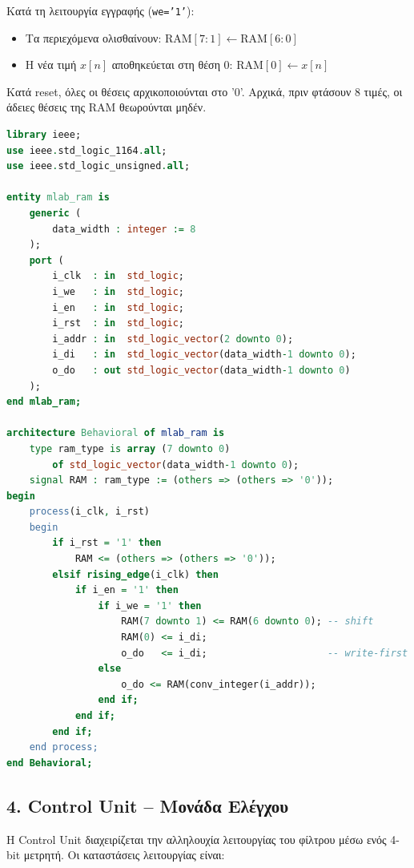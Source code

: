 \documentclass[12pt]{article}
\begin{document}
Κατά τη λειτουργία εγγραφής (\texttt{we='1'}):
\begin{itemize}
    \item Τα περιεχόμενα ολισθαίνουν: $\text{RAM}[7:1] \leftarrow \text{RAM}[6:0]$
    \item Η νέα τιμή $x[n]$ αποθηκεύεται στη θέση 0: $\text{RAM}[0] \leftarrow x[n]$
\end{itemize}

Κατά reset, όλες οι θέσεις αρχικοποιούνται στο '0'. Αρχικά, πριν φτάσουν 8 τιμές, οι άδειες θέσεις της RAM θεωρούνται μηδέν.

\begin{lstlisting}[language=VHDL]
library ieee;
use ieee.std_logic_1164.all;
use ieee.std_logic_unsigned.all;

entity mlab_ram is
    generic (
        data_width : integer := 8
    );
    port (
        i_clk  : in  std_logic;
        i_we   : in  std_logic;
        i_en   : in  std_logic;
        i_rst  : in  std_logic;
        i_addr : in  std_logic_vector(2 downto 0);
        i_di   : in  std_logic_vector(data_width-1 downto 0);
        o_do   : out std_logic_vector(data_width-1 downto 0)
    );
end mlab_ram;

architecture Behavioral of mlab_ram is
    type ram_type is array (7 downto 0)
        of std_logic_vector(data_width-1 downto 0);
    signal RAM : ram_type := (others => (others => '0'));
begin
    process(i_clk, i_rst)
    begin
        if i_rst = '1' then
            RAM <= (others => (others => '0'));
        elsif rising_edge(i_clk) then
            if i_en = '1' then
                if i_we = '1' then
                    RAM(7 downto 1) <= RAM(6 downto 0); -- shift
                    RAM(0) <= i_di;
                    o_do   <= i_di;                     -- write-first
                else
                    o_do <= RAM(conv_integer(i_addr));
                end if;
            end if;
        end if;
    end process;
end Behavioral;
\end{lstlisting}

\subsection*{4. Control Unit -- Μονάδα Ελέγχου}

Η Control Unit διαχειρίζεται την αλληλουχία λειτουργίας του φίλτρου μέσω ενός 4-bit μετρητή. Οι καταστάσεις λειτουργίας είναι:
\end{document}
